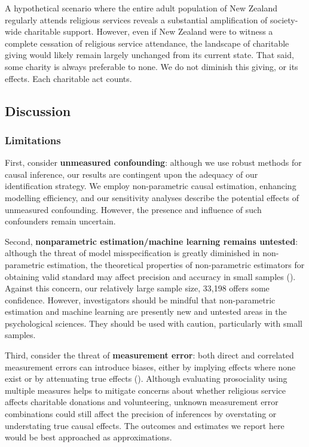 \documentclass[
  single column]{article}
\begin{document}
A hypothetical scenario where the entire adult population of New Zealand
regularly attends religious services reveals a substantial amplification
of society-wide charitable support. However, even if New Zealand were to
witness a complete cessation of religious service attendance, the
landscape of charitable giving would likely remain largely unchanged
from its current state. That said, some charity is always preferable to
none. We do not diminish this giving, or its effects. Each charitable
act counts.

\subsection{Discussion}\label{discussion}

\subsubsection{Limitations}\label{limitations}

First, consider \textbf{unmeasured confounding}: although we use robust
methods for causal inference, our results are contingent upon the
adequacy of our identification strategy. We employ non-parametric causal
estimation, enhancing modelling efficiency, and our sensitivity analyses
describe the potential effects of unmeasured confounding. However, the
presence and influence of such confounders remain uncertain.

Second, \textbf{nonparametric estimation/machine learning remains
untested}: although the threat of model misspecification is greatly
diminished in non-parametric estimation, the theoretical properties of
non-parametric estimators for obtaining valid standard may affect
precision and accuracy in small samples
(). Against
this concern, our relatively large sample size, 33,198 offers some
confidence. However, investigators should be mindful that non-parametric
estimation and machine learning are presently new and untested areas in
the psychological sciences. They should be used with caution,
particularly with small samples.

Third, consider the threat of \textbf{measurement error}: both direct
and correlated measurement errors can introduce biases, either by
implying effects where none exist or by attenuating true effects
(). Although evaluating prosociality using multiple measures helps
to mitigate concerns about whether religious service affects charitable
donations and volunteering, unknown measurement error combinations could
still affect the precision of inferences by overstating or understating
true causal effects. The outcomes and estimates we report here would be
best approached as approximations.
\end{document}

